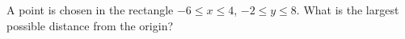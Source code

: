 A point is chosen in the rectangle $-6\le x\le4$, $-2\le y\le8$. What is the largest possible distance from the origin?
